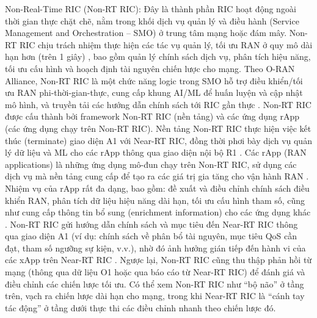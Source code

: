 Non-Real-Time RIC (Non-RT RIC): Đây là thành phần RIC hoạt động ngoài thời gian thực chặt chẽ, nằm trong khối dịch vụ quản lý và điều hành (Service Management and Orchestration – SMO) ở trung tâm mạng hoặc đám mây. Non-RT RIC chịu trách nhiệm thực hiện các tác vụ quản lý, tối ưu RAN ở quy mô dài hạn hơn (trên 1 giây) \cite{Understanding_O-Ran}, bao gồm quản lý chính sách dịch vụ, phân tích hiệu năng, tối ưu cấu hình và hoạch định tài nguyên chiến lược cho mạng. Theo O-RAN Alliance, Non-RT RIC là một chức năng logic trong SMO hỗ trợ điều khiển/tối ưu RAN phi-thời-gian-thực, cung cấp khung AI/ML để huấn luyện và cập nhật mô hình, và truyền tải các hướng dẫn chính sách tới RIC gần thực \cite{Oran_overview} \cite{etsi_oranArchitecture}. Non-RT RIC được cấu thành bởi framework Non-RT RIC (nền tảng) và các ứng dụng rApp (các ứng dụng chạy trên Non-RT RIC). Nền tảng Non-RT RIC thực hiện việc kết thúc (terminate) giao diện A1 với Near-RT RIC, đồng thời phơi bày dịch vụ quản lý dữ liệu và ML cho các rApp thông qua giao diện nội bộ R1 \cite{etsi_oranArchitecture}. Các rApp (RAN applications) là những ứng dụng mô-đun chạy trên Non-RT RIC, sử dụng các dịch vụ mà nền tảng cung cấp để tạo ra các giá trị gia tăng cho vận hành RAN \cite{etsi_oranArchitecture}. Nhiệm vụ của rApp rất đa dạng, bao gồm: đề xuất và điều chỉnh chính sách điều khiển RAN, phân tích dữ liệu hiệu năng dài hạn, tối ưu cấu hình tham số, cũng như cung cấp thông tin bổ sung (enrichment information) cho các ứng dụng khác \cite{etsi_oranArchitecture}. Non-RT RIC gửi hướng dẫn chính sách và mục tiêu đến Near-RT RIC thông qua giao diện A1 (ví dụ: chính sách về phân bổ tài nguyên, mục tiêu QoS cần đạt, tham số ngưỡng sự kiện, v.v.), nhờ đó ảnh hưởng gián tiếp đến hành vi của các xApp trên Near-RT RIC \cite{etsi_oranArchitecture}. Ngược lại, Non-RT RIC cũng thu thập phản hồi từ mạng (thông qua dữ liệu O1 hoặc qua báo cáo từ Near-RT RIC) để đánh giá và điều chỉnh các chiến lược tối ưu. Có thể xem Non-RT RIC như “bộ não” ở tầng trên, vạch ra chiến lược dài hạn cho mạng, trong khi Near-RT RIC là “cánh tay tác động” ở tầng dưới thực thi các điều chỉnh nhanh theo chiến lược đó. 